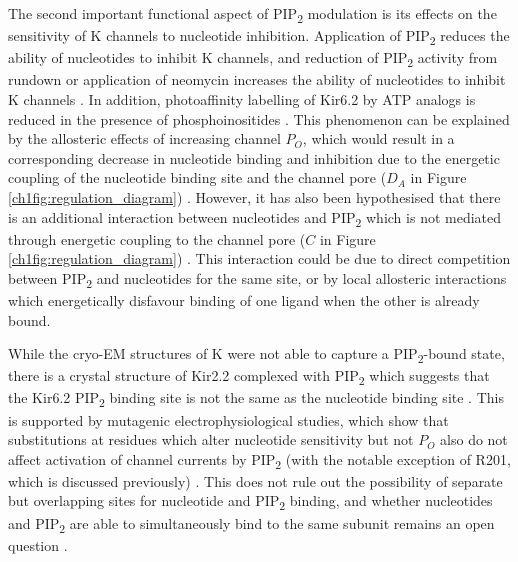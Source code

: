The second important functional aspect of PIP\textsubscript{2} modulation is its effects on the sensitivity of K\ATP{} channels to nucleotide inhibition.
Application of PIP\textsubscript{2} reduces the ability of nucleotides to inhibit K\ATP{} channels, and reduction of PIP\textsubscript{2} activity from rundown or application of neomycin increases the ability of nucleotides to inhibit K\ATP{} channels \cite{baukrowitz_pip2_1998, shyng_membrane_1998, fan_phosphoinositides_1999, enkvetchakul_kinetic_2000}.
In addition, photoaffinity labelling of Kir6.2 by ATP analogs is reduced in the presence of phosphoinositides \cite{wang_compromised_2002}.
This phenomenon can be explained by the allosteric effects of increasing channel $P_O$, which would result in a corresponding decrease in nucleotide binding and inhibition due to the energetic coupling of the nucleotide binding site and the channel pore ($D_A$ in Figure \ref{ch1fig:regulation_diagram}) \cite{proks_modeling_2009}.
However, it has also been hypothesised that there is an additional interaction between nucleotides and PIP\textsubscript{2} which is not mediated through energetic coupling to the channel pore ($C$ in Figure \ref{ch1fig:regulation_diagram}) \cite{fan_phosphoinositides_1999, macgregor_nucleotides_2002, proks_modeling_2009, haider_identification_2007}.
This interaction could be due to direct competition between PIP\textsubscript{2} and nucleotides for the same site, or by local allosteric interactions which energetically disfavour binding of one ligand when the other is already bound.

While the cryo-EM structures of K\ATP{} were not able to capture a PIP\textsubscript{2}-bound state, there is a crystal structure of Kir2.2 complexed with PIP\textsubscript{2} which suggests that the Kir6.2 PIP\textsubscript{2} binding site is not the same as the nucleotide binding site \cite{hansen_structural_2011}.
This is supported by mutagenic electrophysiological studies, which show that substitutions at residues which alter nucleotide sensitivity but not $P_O$ also do not affect activation of channel currents by PIP\textsubscript{2} (with the notable exception of R201, which is discussed previously) \cite{fan_anionic_1997, shyng_structural_2000, schulze_phosphatidylinositol_2003, haider_identification_2007}.
This does not rule out the possibility of separate but overlapping sites for nucleotide and PIP\textsubscript{2} binding, and whether nucleotides and PIP\textsubscript{2} are able to simultaneously bind to the same subunit remains an open question \cite{enkvetchakul_gating_2003-2, proks_modeling_2009}.


